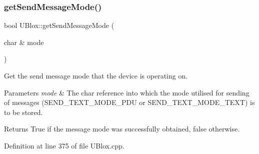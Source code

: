 \subsubsection{\texorpdfstring{get\+Send\+Message\+Mode()}{getSendMessageMode()}}
{\footnotesize\ttfamily bool U\+Blox\+::get\+Send\+Message\+Mode (\begin{DoxyParamCaption}\item[{char \&}]{mode }\end{DoxyParamCaption})}

Get the send message mode that the device is operating on.


\begin{DoxyParams}{Parameters}
{\em mode} & The char reference into which the mode utilised for sending of messages (S\+E\+N\+D\+\_\+\+T\+E\+X\+T\+\_\+\+M\+O\+D\+E\+\_\+\+P\+DU or S\+E\+N\+D\+\_\+\+T\+E\+X\+T\+\_\+\+M\+O\+D\+E\+\_\+\+T\+E\+XT) is to be stored. \\
\hline
\end{DoxyParams}
\begin{DoxyReturn}{Returns}
True if the message mode was successfully obtained, false otherwise. 
\end{DoxyReturn}


Definition at line 375 of file U\+Blox.\+cpp.


